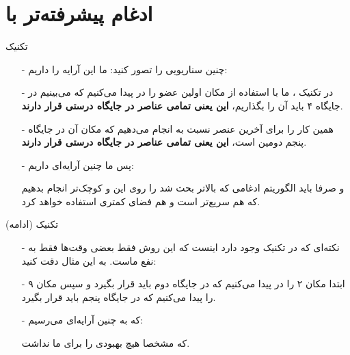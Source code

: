 \section{ادغام پیشرفته‌تر با }
\begin{frame}{تکنیک }
\begin{itemize}\itemr
\item[-]
چنین سناریویی را تصور کنید: ما این آرایه‌ را داریم:

\begin{lfl}
\end{lfl}

\item[-]
در تکنیک ، ما با استفاده از  مکان اولین عضو 
را در 
پیدا می‌کنیم که می‌بینیم در جایگاه ۴ باید آن را بگذاریم، \textbf{این یعنی تمامی عناصر \m{[1, 2, 3]} در جایگاه درستی قرار دارند}.

\item[-]
همین کار را برای آخرین عنصر 
نسبت به 
انجام می‌دهیم که مکان آن در جایگاه پنجم دومین  است، \textbf{این یعنی تمامی عناصر  در جایگاه درستی قرار دارند}.

\item[-]
پس ما چنین آرایه‌ای داریم:
\begin{lfl}
\end{lfl}
و صرفا باید الگوریتم ادغامی که بالاتر بحث شد را روی این 
و 
کوچک‌تر انجام بدهیم که هم سریع‌تر است و هم فضای کمتری استفاده خواهد کرد.
\end{itemize}
\end{frame}

\begin{frame}{تکنیک  (ادامه)}
\begin{itemize}\itemr
\item[-]
نکته‌ای که در تکنیک  وجود دارد اینست که این روش فقط بعضی وقت‌ها فقط به نفع ماست. به این مثال دقت کنید:
\begin{lfl}
\end{lfl}

\item[-]
ابتدا مکان ۲ را در 
پیدا می‌کنیم که در جایگاه دوم باید قرار بگیرد و سپس مکان ۹ را پیدا می‌کنیم که در جایگاه پنجم باید قرار بگیرد.

\item[-]
که به چنین آرایه‌ای می‌رسیم:
\begin{lfl}
\end{lfl}

که مشخصا هیچ بهبودی را برای ما نداشت.
\end{itemize}
\end{frame}

